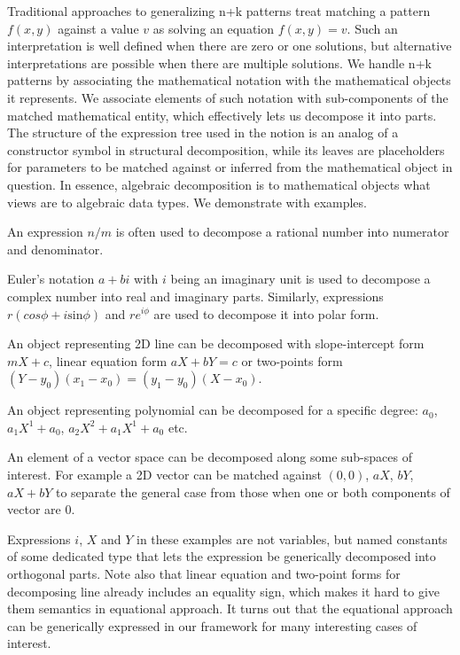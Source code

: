 \documentclass{llncs}
\begin{document}
Traditional approaches to generalizing n+k patterns treat matching a pattern 
$f(x,y)$ against a value $v$ as solving an equation $f(x,y)=v$\cite{OosterhofThesis}. 
Such an interpretation is well defined when there are zero or one solutions,
but alternative interpretations are possible when there are multiple solutions. 
We handle n+k patterns by 
associating the mathematical notation with the mathematical objects it 
represents. 
We associate elements of such notation with 
sub-components of the matched mathematical entity, which 
effectively lets us decompose it into parts. The structure of the expression 
tree used in the notion is an analog of a constructor symbol in structural 
decomposition, while its leaves are placeholders for parameters to be matched 
against or inferred from the mathematical object in question. In essence,
algebraic decomposition is to mathematical objects what views are to algebraic 
data types. We demonstrate with examples.

\begin{compactitem}
\setlength{\itemsep}{0pt}
\setlength{\parskip}{0pt}
\item An expression $n/m$ is often used to decompose a rational number into 
      numerator and denominator.
\item Euler's notation $a+bi$ with $i$ being an imaginary unit is used to 
      decompose a complex number into real and imaginary parts. Similarly, 
      expressions $r(cos \phi + i\mathrm{sin} \phi)$ and $re^{i\phi}$ are used to 
      decompose it into polar form.
\item An object representing 2D line can be decomposed with slope-intercept form 
      $mX+c$, linear equation form $aX+bY=c$ or two-points form 
      $(Y-y_0)(x_1-x_0)=(y_1-y_0)(X-x_0)$.
\item An object representing polynomial can be decomposed for a specific degree: 
      $a_0$, $a_1X^1+a_0$, $a_2X^2+a_1X^1+a_0$ etc.
\item An element of a vector space can be decomposed along some sub-spaces of 
      interest. For example a 2D vector can be matched against $(0,0)$, $aX$, 
      $bY$, $aX+bY$ to separate the general case from those when one or both
      components of vector are $0$.
\end{compactitem}

\noindent
Expressions $i$, $X$ and $Y$ in these examples are not variables, but named 
constants of some dedicated type that lets the expression be generically 
decomposed into orthogonal parts. Note also that linear equation and two-point 
forms for decomposing line already includes an equality sign, which makes it 
hard to give them semantics in equational approach. It turns out that the 
equational approach can be generically expressed in our framework for many 
interesting cases of interest.
\end{document}
